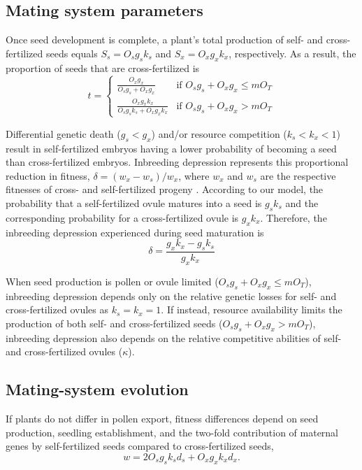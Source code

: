 \documentclass[letterpaper,titlepage]{scrartcl}
\begin{document}
\subsection{Mating system parameters}
Once seed development is complete, a plant's total production of self-
and cross-fertilized seeds equals $S_{s}=O_{s}g_{s}k_{s}$ and
$S_{x}=O_{x}g_{x}k_{x}$, respectively. As a result, the proportion of
seeds that are cross-fertilized is
\begin{equation*}
  t=
  \begin{cases}
    \frac{O_{x}g_{x}}{O_{s}g_{s}+O_{x}g_{x}} & \text{if } O_{s}g_{s}+O_{x}g_{x}\leq mO_{T}\\
    \frac{O_{x}g_{x}k_{x}}{O_{s}g_{s}k_{s}+O_{x}g_{x}k_{x}} &\text{if
    } O_{s}g_{s}+O_{x}g_{x}>mO_{T}
  \end{cases}
\end{equation*}

Differential genetic death ($g_{s}<g_{x}$) and/or resource competition
($k_{s}<k_{x}<1$) result in self-fertilized embryos having a lower
probability of becoming a seed than cross-fertilized
embryos. Inbreeding depression represents this proportional reduction
in fitness, $\delta=(w_{x}-w_{s})/w_{x}$, where $w_{x}$ and $w_{s}$
are the respective fitnesses of cross- and self-fertilized progeny
\citep{Charlesworth87}. According to our model, the probability that a
self-fertilized ovule matures into a seed is $g_{s}k_{s}$ and the
corresponding probability for a cross-fertilized ovule is
$g_{x}k_{x}$. Therefore, the inbreeding depression experienced during
seed maturation is
\begin{equation*}
  \delta=\frac{g_{x}k_{x}-g_{s}k_{s}}{g_{x}k_{x}}
\end{equation*}

When seed production is pollen or ovule limited
($O_{s}g_{s}+O_{x}g_{x} \leqslant mO_{T}$), inbreeding depression
depends only on the relative genetic losses for self- and
cross-fertilized ovules as $k_{s}=k_{x}=1$. If instead, resource
availability limits the production of both self- and cross-fertilized
seeds ($O_{s}g_{s}+O_{x}g_{x}>mO_{T}$), inbreeding depression also
depends on the relative competitive abilities of self- and
cross-fertilized ovules ($\kappa$).

\subsection{Mating-system evolution}
If plants do not differ in pollen export, fitness differences depend
on seed production, seedling establishment, and the two-fold
contribution of maternal genes by self-fertilized seeds compared to
cross-fertilized seeds,
\begin{equation*}
  w=2O_{s}g_{s}k_{s}d_{s} + O_{x}g_{x}k_{x}d_{x}.
\end{equation*}
\end{document}

